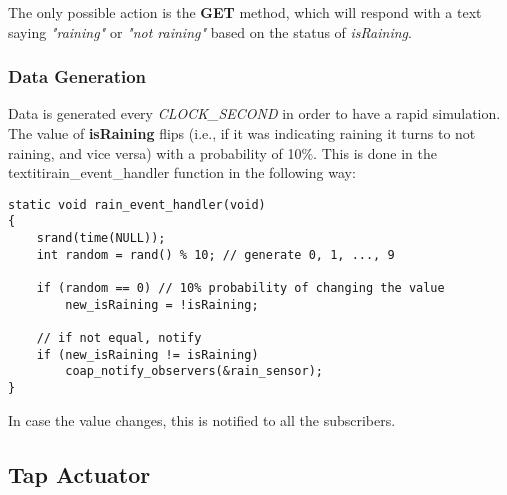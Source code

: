 The only possible action is the \textbf{GET} method, which will respond with a text saying \textit{"raining"} or \textit{"not raining"} based on the status of \textit{isRaining}.

\subsubsection{Data Generation}
Data is generated every \textit{CLOCK\_SECOND} in order to have a rapid simulation. The value of \textbf{isRaining} flips (i.e., if it was indicating raining it turns to not raining, and vice versa) with a probability of 10\%. This is done in the textiti{rain\_event\_handler} function in the following way:

\begin{lstlisting}
static void rain_event_handler(void)
{
    srand(time(NULL));
    int random = rand() % 10; // generate 0, 1, ..., 9
    
    if (random == 0) // 10% probability of changing the value
        new_isRaining = !isRaining;

    // if not equal, notify
    if (new_isRaining != isRaining)
        coap_notify_observers(&rain_sensor);
}
\end{lstlisting}

In case the value changes, this is notified to all the subscribers.








\subsection{Tap Actuator}
